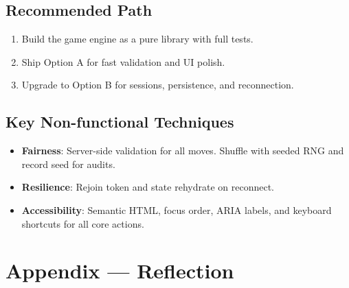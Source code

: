 \documentclass[12pt]{article}
\begin{document}
\subsection{Recommended Path}
\begin{enumerate}
  \item Build the game engine as a pure library with full tests.
  \item Ship Option A for fast validation and UI polish.
  \item Upgrade to Option B for sessions, persistence, and reconnection.
\end{enumerate}

\subsection{Key Non-functional Techniques}
\begin{itemize}
  \item \textbf{Fairness}: Server-side validation for all moves. Shuffle with seeded RNG and record seed for audits.
  \item \textbf{Resilience}: Rejoin token and state rehydrate on reconnect.
  \item \textbf{Accessibility}: Semantic HTML, focus order, ARIA labels, and keyboard shortcuts for all core actions.
\end{itemize}

\newpage{}
\section*{Appendix --- Reflection}




\end{document}
